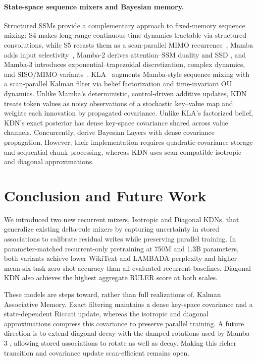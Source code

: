 \documentclass{article} %
\begin{document}
\paragraph{State-space sequence mixers and Bayesian memory.}
Structured SSMs provide a complementary approach to fixed-memory sequence mixing: S4 makes long-range continuous-time dynamics
tractable via structured convolutions, while S5 recasts them as a scan-parallel MIMO
recurrence~\citep{gu2022efficiently,smith2023simplified},
Mamba adds input selectivity~\citep{gu2023mamba}, Mamba-2 derives attention--SSM duality and SSD
\citep{dao2024transformers}, and Mamba-3 introduces exponential--trapezoidal discretization, complex
dynamics, and SISO/MIMO variants~\citep{lahoti2026mamba3}. KLA~\citep{shaj2026kalmanlinearattention}
augments Mamba-style sequence mixing with a scan-parallel Kalman filter via belief factorization
and time-invariant OU dynamics. Unlike Mamba's deterministic, control-driven additive updates, KDN treats token values
as noisy observations of a stochastic key--value map and weights each innovation by propagated
covariance. Unlike KLA's factorized belief, KDN's exact posterior has dense key-space covariance
shared across value channels.
Concurrently, \citet{dowling2026memory} derive Bayesian Layers with dense covariance propagation.
However, their implementation requires quadratic covariance storage and sequential chunk processing,
whereas KDN uses scan-compatible isotropic and diagonal approximations.

\vspace{-1mm}
\section{Conclusion and Future Work}
\vspace{-1mm}
\label{sec:discussion-conclusion}

We introduced two new recurrent mixers, Isotropic and Diagonal KDNs, that generalize existing
delta-rule mixers by capturing uncertainty in stored associations to calibrate residual writes
while preserving parallel training. In parameter-matched recurrent-only pretraining at 750M and
1.3B parameters, both variants achieve lower WikiText and LAMBADA perplexity and higher mean
six-task zero-shot accuracy than all evaluated recurrent baselines. Diagonal KDN also achieves
the highest aggregate RULER score at both scales.

These models are steps toward, rather than full realizations of, Kalman Associative Memory. Exact
filtering maintains a dense key-space covariance and a state-dependent Riccati update, whereas the
isotropic and diagonal approximations compress this covariance to preserve parallel training. A future direction is to extend diagonal decay with the damped rotations used by Mamba-3
\citep{lahoti2026mamba3}, allowing stored associations to rotate as well as decay. Making this richer
transition and covariance update scan-efficient remains open.
\end{document}

